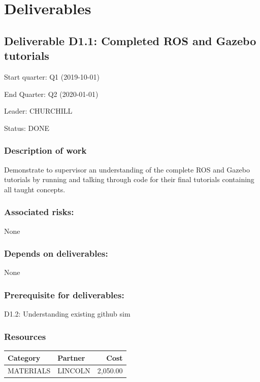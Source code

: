 \documentclass[english]{article}
\begin{document}
\section{Deliverables}

\subsection*{Deliverable D1.1: Completed ROS and Gazebo tutorials}

Start quarter: Q1 (2019-10-01) 
 
 End Quarter: Q2 (2020-01-01) 

 Leader: CHURCHILL

  Status: DONE 

 \subsubsection*{Description of work}

Demonstrate to supervisor an understanding of the complete ROS and Gazebo tutorials by running and talking through code for their final tutorials containing all taught concepts.

\subsubsection*{Associated risks:}

None

\subsubsection*{Depends on deliverables:}

None



\subsubsection*{Prerequisite for deliverables:}

D1.2: Understanding existing github sim



\subsubsection*{Resources}

\begin{tabular}{ | l | l | r | }
\hline
 Category & Partner & Cost \\ 
 \hline
 MATERIALS & LINCOLN &  2,050.00 \\ 
\hline
 \end{tabular}
\end{document}
